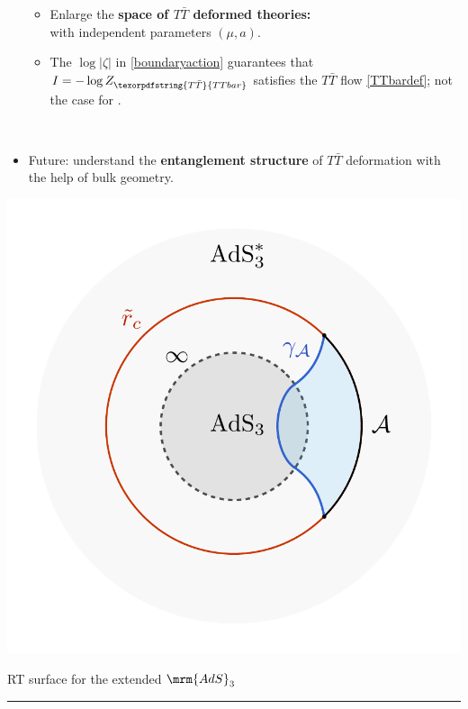 \documentclass[10pt]{article}
\newcommand{\citations}[1]{{\footnotesize#1\par}}
\newcommand{\TTbar}{\texorpdfstring{\ensuremath{T\bar{T}}}{TTbar}\xspace}
\begin{document}
\begin{multicols}{3}
\begin{itemize}
\begin{itemize}
	\item Enlarge the \textbf{space of \TTbar deformed theories:}\\
	with \mbox{independent} parameters $(\mu,a)$.
	
	\item The $\log |\zeta|$ in \eqref{boundaryaction} guarantees that $I = -\log Z_{\TTbar}$ \mbox{satisfies} the $T\bar T$ flow \eqref{TTbardef}; not the case for \cite{Donnelly:2018bef}.
	\end{itemize}

	
	\begin{flushright}
		\vspace{-.6\baselineskip}
		\citations{
			\textcite{Caputa:2020lpa}\\
			\textcite{Li:2020zjb}
		}\vspace{-.8\baselineskip}
	\end{flushright}
	
	\item Future: understand the \textbf{entanglement structure} of \TTbar deformation with the help of bulk geometry.
	\begin{flushright}
		\vspace{-.5\baselineskip}
		\citations{
			\textcite{Lewkowycz:2019xse}
		}
	\end{flushright}
\end{itemize}
\centering\vspace{-1\baselineskip}
\includegraphics[width=.6\linewidth]{img/RT-AdS.pdf}

\vspace{-1\baselineskip}
{\footnotesize RT surface for the extended $\mrm{AdS}_3$}

\vspace{.8\baselineskip}
\hrule
\vspace{.1\baselineskip}


\end{multicols}
\end{document}
